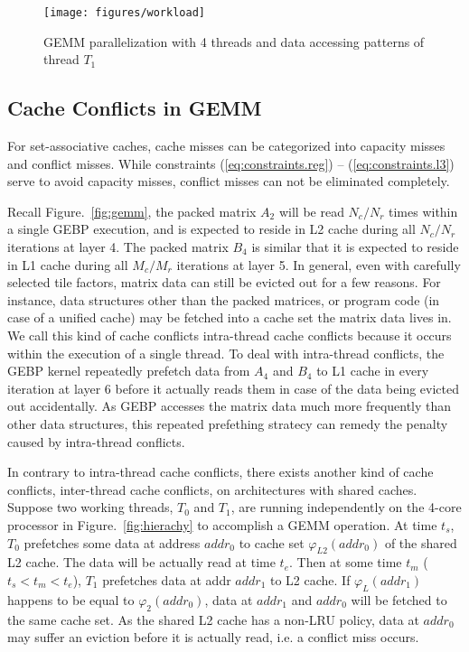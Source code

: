 \begin{figure}[t]
  \centering
  \texttt{[image: figures/workload]}
  \caption{GEMM parallelization with 4 threads and data accessing patterns of thread $T_1$}
  \label{fig:workload}
\end{figure}

\subsection{Cache Conflicts in GEMM}\label{subsec:cache-conflicts}

For set-associative caches, cache misses can be categorized
into capacity misses and conflict misses.
While constraints (\ref{eq:constraints.reg}) -- (\ref{eq:constraints.l3})
serve to avoid capacity misses,
conflict misses can not be eliminated completely.

Recall Figure.~\ref{fig:gemm}, the packed matrix $A_2$
will be read $N_c/N_r$ times within a single GEBP execution,
and is expected to reside in L2 cache during all $N_c/N_r$ iterations at layer 4.
The packed matrix $B_4$ is similar that it is expected to
reside in L1 cache during all $M_c/M_r$ iterations at layer 5.
In general, even with carefully selected tile factors,
matrix data can still be evicted out for a few reasons.
For instance, data structures other than the packed matrices,
or program code (in case of a unified cache) may be fetched into a
cache set the matrix data lives in.
We call this kind of cache conflicts intra-thread cache conflicts
because it occurs within the execution of a single thread.
To deal with intra-thread conflicts,
the GEBP kernel repeatedly prefetch data from $A_4$ and $B_4$ to L1 cache
in every iteration at layer 6 before it actually reads them in case of
the data being evicted out accidentally.
As GEBP accesses the matrix data much more frequently than other
data structures, this repeated prefething stratecy
can remedy the penalty caused by intra-thread conflicts.

In contrary to intra-thread cache conflicts,
there exists another kind of cache conflicts,
inter-thread cache conflicts, on architectures with shared caches.
Suppose two working threads, $T_0$ and $T_1$, are running independently
on the 4-core processor in Figure.~\ref{fig:hierachy}
to accomplish a GEMM operation.
At time $t_s$, $T_0$ prefetches some data at address $addr_0$
to cache set $\varphi_{L2}(addr_0)$ of the shared L2 cache.
The data will be actually read at time $t_e$.
Then at some time $t_m$ ($t_s < t_m < t_e$),
$T_1$ prefetches data at addr $addr_1$ to L2 cache.
If $\varphi_L(addr_1)$ happens to be equal to $\varphi_2(addr_0)$,
data at $addr_1$ and $addr_0$ will be fetched to the same cache set.
As the shared L2 cache has a non-LRU policy,
data at $addr_0$ may suffer an eviction before it is actually read,
i.e. a conflict miss occurs.

